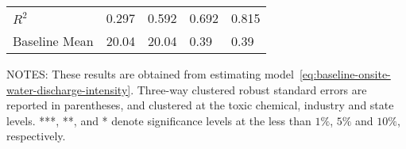 \begin{table}[H]
{\begin{tabular}{@{}lllll@{}}
            $R^2$              & 0.297     & 0.592     & 0.692     & 0.815     \\
            Baseline Mean      & 20.04     & 20.04     & 0.39      & 0.39      \\ \bottomrule\bottomrule
        \end{tabular}%
    }
    \begin{minipage}{\columnwidth}
        \vspace{0.05in}
        NOTES: These results are obtained from estimating model~\ref{eq:baseline-onsite-water-discharge-intensity}. Three-way clustered robust standard errors are reported in parentheses, and clustered at the toxic chemical, industry and state levels. ***, **, and * denote significance levels at the less than $1\%$, $5\%$ and $10\%$, respectively.
    \end{minipage}
\end{table}